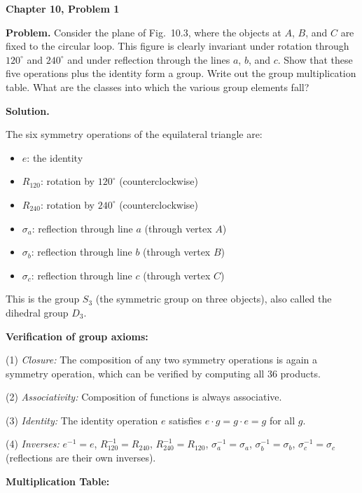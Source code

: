 \documentclass[12pt]{article}
\begin{document}
\begin{center}
{\Large\bfseries Chapter 10, Problem 1}
\end{center}

\noindent\textbf{Problem.} Consider the plane of Fig.~10.3, where the objects at $A$, $B$, and $C$ are fixed to the circular loop. This figure is clearly invariant under rotation through $120^\circ$ and $240^\circ$ and under reflection through the lines $a$, $b$, and $c$. Show that these five operations plus the identity form a group. Write out the group multiplication table. What are the classes into which the various group elements fall?

\bigskip
\noindent\textbf{Solution.}

The six symmetry operations of the equilateral triangle are:
\begin{itemize}
\item $e$: the identity
\item $R_{120}$: rotation by $120^\circ$ (counterclockwise)
\item $R_{240}$: rotation by $240^\circ$ (counterclockwise)
\item $\sigma_a$: reflection through line $a$ (through vertex $A$)
\item $\sigma_b$: reflection through line $b$ (through vertex $B$)
\item $\sigma_c$: reflection through line $c$ (through vertex $C$)
\end{itemize}

This is the group $S_3$ (the symmetric group on three objects), also called the dihedral group $D_3$.

\medskip
\noindent\textbf{Verification of group axioms:}

\noindent (1) \textit{Closure:} The composition of any two symmetry operations is again a symmetry operation, which can be verified by computing all 36 products.

\noindent (2) \textit{Associativity:} Composition of functions is always associative.

\noindent (3) \textit{Identity:} The identity operation $e$ satisfies $e \cdot g = g \cdot e = g$ for all $g$.

\noindent (4) \textit{Inverses:} $e^{-1} = e$, $R_{120}^{-1} = R_{240}$, $R_{240}^{-1} = R_{120}$, $\sigma_a^{-1} = \sigma_a$, $\sigma_b^{-1} = \sigma_b$, $\sigma_c^{-1} = \sigma_c$ (reflections are their own inverses).

\medskip
\noindent\textbf{Multiplication Table:}
\end{document}

